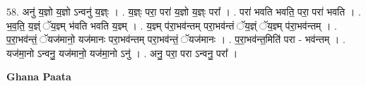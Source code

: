\documentclass[17pt]{extarticle}
\begin{document}
58. अनु॑ य॒ज्ञो य॒ज्ञो ऽन्वनु॑ य॒ज्ञ्ः । . य॒ज्ञ्ः परा॒ परा॑ य॒ज्ञो य॒ज्ञ्ः परा᳚ । . परा॑ भवति भवति॒ परा॒ परा॑ भवति । . भ॒व॒ति॒ य॒ज्ञ्ं ॅय॒ज्ञ्म् भ॑वति भवति य॒ज्ञ्म् । . य॒ज्ञ्म् प॑रा॒भव॑न्तम् परा॒भव॑न्तं ॅय॒ज्ञ्ं ॅय॒ज्ञ्म् प॑रा॒भव॑न्तम् । . प॒रा॒भव॑न्तं॒ ॅयज॑मानो॒ यज॑मानः परा॒भव॑न्तम् परा॒भव॑न्तं॒ ॅयज॑मानः । . प॒रा॒भव॑न्त॒मिति॑ परा - भव॑न्तम् । . यज॑मा॒नो ऽन्वनु॒ यज॑मानो॒ यज॑मा॒नो ऽनु॑ । . अनु॒ परा॒ परा ऽन्वनु॒ परा᳚ । \newline

\textbf{Ghana Paata } \newline
\end{document}
